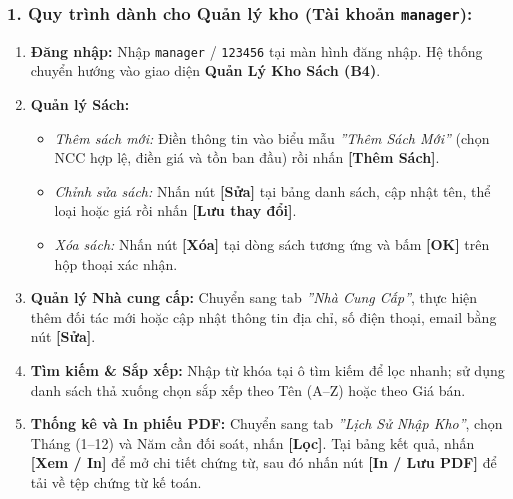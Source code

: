\documentclass[12pt,a4paper]{article}
\begin{document}
\subsubsection*{1. Quy trình dành cho Quản lý kho (Tài khoản \texttt{manager}):}
\begin{enumerate}
    \item \textbf{Đăng nhập:} Nhập \texttt{manager} / \texttt{123456} tại màn hình đăng nhập. Hệ thống chuyển hướng vào giao diện \textbf{Quản Lý Kho Sách (B4)}.
    \item \textbf{Quản lý Sách:}
    \begin{itemize}
        \item \textit{Thêm sách mới:} Điền thông tin vào biểu mẫu \textit{''Thêm Sách Mới''} (chọn NCC hợp lệ, điền giá và tồn ban đầu) rồi nhấn \textbf{[Thêm Sách]}.
        \item \textit{Chỉnh sửa sách:} Nhấn nút \textbf{[Sửa]} tại bảng danh sách, cập nhật tên, thể loại hoặc giá rồi nhấn \textbf{[Lưu thay đổi]}.
        \item \textit{Xóa sách:} Nhấn nút \textbf{[Xóa]} tại dòng sách tương ứng và bấm \textbf{[OK]} trên hộp thoại xác nhận.
    \end{itemize}
    \item \textbf{Quản lý Nhà cung cấp:} Chuyển sang tab \textit{''Nhà Cung Cấp''}, thực hiện thêm đối tác mới hoặc cập nhật thông tin địa chỉ, số điện thoại, email bằng nút \textbf{[Sửa]}.
    \item \textbf{Tìm kiếm \& Sắp xếp:} Nhập từ khóa tại ô tìm kiếm để lọc nhanh; sử dụng danh sách thả xuống chọn sắp xếp theo Tên (A--Z) hoặc theo Giá bán.
    \item \textbf{Thống kê và In phiếu PDF:} Chuyển sang tab \textit{''Lịch Sử Nhập Kho''}, chọn Tháng (1--12) và Năm cần đối soát, nhấn \textbf{[Lọc]}. Tại bảng kết quả, nhấn \textbf{[Xem / In]} để mở chi tiết chứng từ, sau đó nhấn nút \textbf{[In / Lưu PDF]} để tải về tệp chứng từ kế toán.
\end{enumerate}
\end{document}
